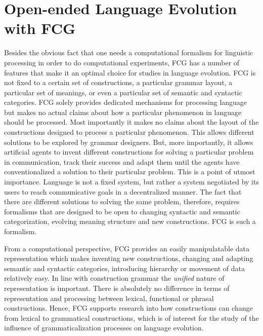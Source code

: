 \section{Open-ended Language Evolution with FCG}
Besides the obvious fact that one needs a computational
formalism for linguistic processing in order to do computational
experiments, FCG has a number
of features that make it an optimal choice for studies
in language evolution. FCG is not fixed to a certain
set of constructions, a particular grammar layout, 
a particular set of meanings,
or even a particular set of semantic and syntactic 
categories. FCG solely provides 
dedicated mechanisms for processing language but
makes no actual claims about how a particular
phenomenon in language should be processed. 
Most importantly it makes no claims about the 
layout of the constructions designed to process
a particular phenomenon. This allows different 
solutions to be explored by grammar designers.
But, more importantly, it allows artificial agents
to invent different constructions for solving a particular
problem in communication, track their success and
adapt them until the agents have conventionalized
a solution to their particular problem. This is a point
of utmost importance. Language is not a fixed system, but
rather a system negotiated by its users to reach
communicative goals in a decentralized manner. 
The fact that there are different solutions to solving
the same problem, therefore, requires formalisms
that are designed to be open to changing syntactic and 
semantic categorization, evolving meaning
structure and new constructions. FCG is such a formalism.

From a computational perspective, FCG provides
an easily manipulatable data representation which makes 
inventing new constructions, changing and
adapting semantic and syntactic categories,
introducing hierarchy or movement of data relatively easy.
In line with construction grammar the \emph{unified} nature
of representation is important. There is absolutely
no difference in terms of representation and processing 
between lexical, functional or phrasal constructions. Hence, FCG
supports research into how constructions can change 
from lexical to grammatical constructions, which is 
of interest for the study of the influence of grammaticalization 
processes on language evolution\citep{traugott1991grammaticalization}.

